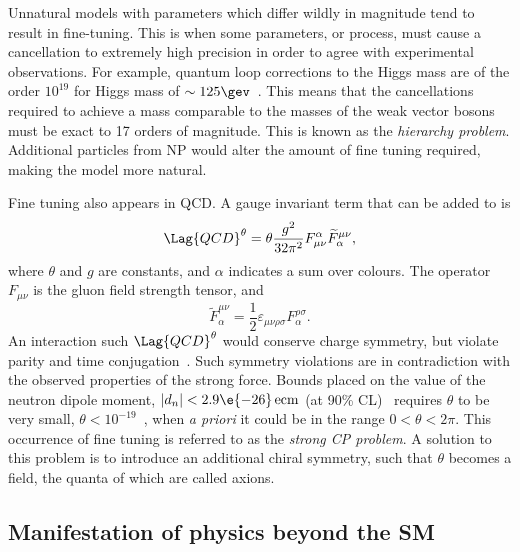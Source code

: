 Unnatural models with parameters which differ wildly in magnitude tend to result in fine-tuning.
This is when some parameters, or process, must cause a cancellation to extremely high precision in
order to agree with experimental observations.
For example, quantum loop corrections to the Higgs mass are of the order $10^{19}$ for Higgs mass
of $\sim125\gev$~\cite{Chatrchyan:2012ufa,Aad:2012tfa}.
This means that the cancellations required to achieve a mass comparable to the masses of the weak
vector bosons must be exact to 17 orders of magnitude.
This is known as the \emph{hierarchy problem}.
Additional particles from NP would alter the amount of fine tuning required, making the model more
natural.

Fine tuning also appears in QCD.
A gauge invariant term that can be added to  is
\begin{equation}
  \Lag{QCD}^\theta = \theta\frac{g^2}{32\pi^2}
  F_{\mu\nu}^\alpha\widetilde F^{\mu\nu}_\alpha,
\end{equation}
where $\theta$ and $g$ are constants, and $\alpha$ indicates a sum over colours.
The operator $F_{\mu\nu}$ is the gluon field strength tensor, and
\begin{equation}
  \widetilde F^{\mu\nu}_\alpha = \frac12\varepsilon_{\mu\nu\rho\sigma}F^{\rho\sigma}_\alpha.
\end{equation}
An interaction such $\Lag{QCD}^\theta$ would conserve charge symmetry, but violate parity and time
conjugation~\cite{Peccei:2006as}.
Such symmetry violations are in contradiction with the observed properties of the strong
force.
Bounds placed on the value of the neutron dipole moment, $|d_n| <2.9\e{-26}\,\mathrm{ecm}$
(at 90\% CL)~\cite{Baker:2006ts} requires $\theta$ to be very small,
$\theta<10^{-19}$~\cite{Crewther:PQref9}, when \emph{a priori} it could be in the range
$0<\theta<2\pi$.
This occurrence of fine tuning is referred to as the \emph{strong CP problem}.
A solution to this problem is to introduce an additional chiral symmetry, such that $\theta$
becomes a field, the quanta of which are called axions.



\subsection{Manifestation of physics beyond the SM}
\label{sec:th:bsm:man}

